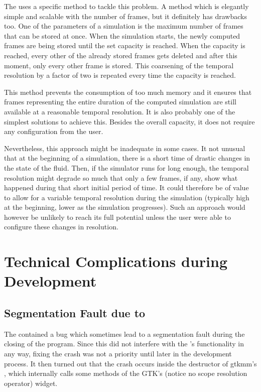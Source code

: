 \documentclass[11pt,a4paper,twoside,openright]{report}
\begin{document}
The \software{} uses a specific method to tackle this problem. A method which is elegantly simple and scalable with the number of frames, but it definitely has drawbacks too. One of the parameters of a simulation is the maximum number of frames that can be stored at once. When the simulation starts, the newly computed frames are being stored until the set capacity is reached. When the capacity is reached, every other of the already stored frames gets deleted and after this moment, only every other frame is stored. This coarsening of the temporal resolution by a factor of two is repeated every time the capacity is reached.

This method prevents the consumption of too much memory and it ensures that frames representing the entire duration of the computed simulation are still available at a reasonable temporal resolution. It is also probably one of the simplest solutions to achieve this. Besides the overall capacity, it does not require any configuration from the user.

Nevertheless, this approach might be inadequate in some cases. It not unusual that at the beginning of a simulation, there is a short time of drastic changes in the state of the fluid. Then, if the simulator runs for long enough, the temporal resolution might degrade so much that only a few frames, if any, show what happened during that short initial period of time. It could therefore be of value to allow for a variable temporal resolution during the simulation (typically high at the beginning, lower as the simulation progresses). Such an approach would however be unlikely to reach its full potential unless the user were able to configure these changes in resolution.

\section{Technical Complications during Development}

\subsection{Segmentation Fault due to }

The \software{} contained a bug which sometimes lead to a segmentation fault during the closing of the program. Since this did not interfere with the \software{}'s functionality in any way, fixing the crash was not a priority until later in the development process. It then turned out that the crash occurs inside the destructor of gtkmm's , which internally calls some methods of the GTK's  (notice no scope resolution operator) widget.
\end{document}
